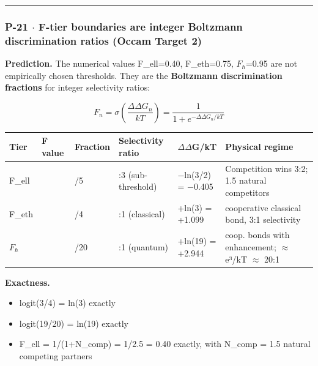 \documentclass[12pt,a4paper]{article}
\begin{document}
\begin{center}
\rule{0.5\textwidth}{0.4pt}
\end{center}

\subsubsection{P-21 $\cdot$ F-tier boundaries are integer Boltzmann discrimination ratios (Occam Target 2)}

\textbf{Prediction.} The numerical values F\_ell=0.40, F\_eth=0.75, $F_{\hbar}$=0.95 are not empirically chosen thresholds. They are the \textbf{Boltzmann discrimination fractions} for integer selectivity ratios:

\[F_n = \sigma\!\left(\frac{\Delta\Delta G_n}{kT}\right) = \frac{1}{1 + e^{-\Delta\Delta G_n / kT}}\]

\begin{table}[htbp]
\centering
\small
{}
\begin{tabularx}{\textwidth}{>{\centering\arraybackslash}X >{\centering\arraybackslash}X >{\centering\arraybackslash}X >{\centering\arraybackslash}X >{\centering\arraybackslash}X >{\centering\arraybackslash}X}
\toprule
\rowcolor{gray!25}\textbf{Tier} & \textbf{F value} & \textbf{Fraction} & \textbf{Selectivity ratio} & \textbf{$\Delta$$\Delta$G/kT} & \textbf{Physical regime} \\
\midrule
\rowcolors{1}{white}{gray!10}
F\_ell & 0.40 & 2/5 & 2:3 (sub-threshold) & $-$ln(3/2) = $-$0.405 & Competition wins 3:2; 1.5 natural competitors \\
F\_eth & 0.75 & 3/4 & 3:1 (classical) & +ln(3) = +1.099 & 1 cooperative classical bond, 3:1 selectivity \\
$F_{\hbar}$ & 0.95 & 19/20 & 19:1 (quantum) & +ln(19) = +2.944 & 2 coop. bonds with enhancement; $\approx$ e³/kT $\approx$ 20:1 \\
\bottomrule
\end{tabularx}
\end{table}

\textbf{Exactness.}

\begin{itemize}
    \item logit(3/4) = ln(3) exactly 
    \item logit(19/20) = ln(19) exactly 
    \item F\_ell = 1/(1+N\_comp) = 1/2.5 = 0.40 exactly, with N\_comp = 1.5 natural competing partners 
\end{itemize}
\end{document}

